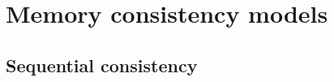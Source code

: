 \documentclass[CS4204-Notes.tex]{subfiles}
\begin{document}
\section{Memory consistency models}

\subsection{Sequential consistency}
\end{document}
